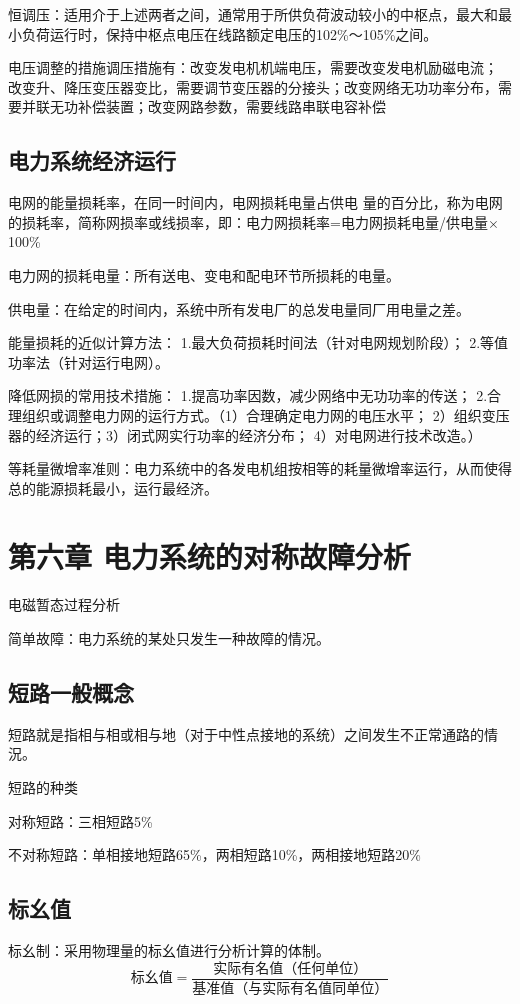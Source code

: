 \documentclass[UTF8, 12pt, a4paper]{ctexart}
\begin{document}
恒调压：适用介于上述两者之间，通常用于所供负荷波动较小的中枢点，最大和最小负荷运行时，保持中枢点电压在线路额定电压的102\%～105\%之间。

电压调整的措施调压措施有：改变发电机机端电压，需要改变发电机励磁电流；
改变升、降压变压器变比，需要调节变压器的分接头；改变网络无功功率分布，需要并联无功补偿装置；改变网路参数，需要线路串联电容补偿
\subsection{电力系统经济运行}
电网的能量损耗率，在同一时间内，电网损耗电量占供电 量的百分比，称为电网的损耗率，简称网损率或线损率，即：电力网损耗率=电力网损耗电量/供电量$\times$100\%

电力网的损耗电量：所有送电、变电和配电环节所损耗的电量。

供电量：在给定的时间内，系统中所有发电厂的总发电量同厂用电量之差。

能量损耗的近似计算方法：
1.最大负荷损耗时间法（针对电网规划阶段）；
2.等值功率法（针对运行电网）。

降低网损的常用技术措施：
1.提高功率因数，减少网络中无功功率的传送；
2.合理组织或调整电力网的运行方式。（1）合理确定电力网的电压水平； 2）组织变压器的经济运行；3）闭式网实行功率的经济分布； 4）对电网进行技术改造。）

等耗量微增率准则：电力系统中的各发电机组按相等的耗量微增率运行，从而使得总的能源损耗最小，运行最经济。
\newpage{}
\section{第六章{} 电力系统的对称故障分析}
电磁暂态过程分析

简单故障：电力系统的某处只发生一种故障的情况。
\subsection{短路一般概念}
短路就是指相与相或相与地（对于中性点接地的系统）之间发生不正常通路的情況。

短路的种类

对称短路：三相短路5\%

不对称短路：单相接地短路65\%，两相短路10\%，两相接地短路20\%
\subsection{标幺值}
标幺制：采用物理量的标幺值进行分析计算的体制。
\[
    \text{标幺值}=\dfrac{\text{实际有名值（任何单位）}}{\text{基准值（与实际有名值同单位）}}
\]
\end{document}

